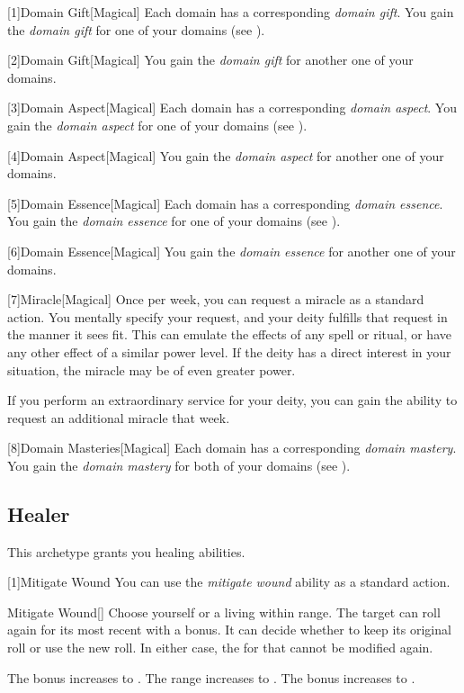         [1]{Domain Gift}[Magical]
        Each domain has a corresponding \textit{domain gift}.
        You gain the \textit{domain gift} for one of your domains (see ).

        [2]{Domain Gift}[Magical]
        You gain the \textit{domain gift} for another one of your domains.

        [3]{Domain Aspect}[Magical]
        Each domain has a corresponding \textit{domain aspect}.
        You gain the \textit{domain aspect} for one of your domains (see ).

        [4]{Domain Aspect}[Magical]
        You gain the \textit{domain aspect} for another one of your domains.

        [5]{Domain Essence}[Magical]
        Each domain has a corresponding \textit{domain essence}.
        You gain the \textit{domain essence} for one of your domains (see ).

        [6]{Domain Essence}[Magical]
        You gain the \textit{domain essence} for another one of your domains.

        [7]{Miracle}[Magical]
        Once per week, you can request a miracle as a standard action.
        You mentally specify your request, and your deity fulfills that request in the manner it sees fit.
        This can emulate the effects of any spell or ritual, or have any other effect of a similar power level.
        If the deity has a direct interest in your situation, the miracle may be of even greater power.

        If you perform an extraordinary service for your deity, you can gain the ability to request an additional miracle that week.

        [8]{Domain Masteries}[Magical]
        Each domain has a corresponding \textit{domain mastery}.
        You gain the \textit{domain mastery} for both of your domains (see ).

    \subsection{Healer}
        This archetype grants you healing abilities.

        [1]{Mitigate Wound} You can use the \textit{mitigate wound} ability as a standard action.
        \begin{freeability}{Mitigate Wound}[]
            Choose yourself or a living  within \rngclose range.
            The target can roll again for its most recent  with a  bonus.
            It can decide whether to keep its original roll or use the new roll.
            In either case, the  for that  cannot be modified again.

            \rankline
             The bonus increases to .
             The range increases to \rnglong.
             The bonus increases to .
        \end{freeability}

